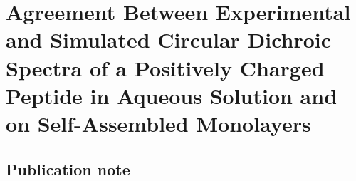 \chapter{Agreement Between Experimental and Simulated Circular Dichroic Spectra of a Positively Charged Peptide in Aqueous Solution and on Self-Assembled Monolayers}\label{helix-folding}

\newcommand{\tbawat}{{2:1 \emph{t}-BuOH/\ce{H2O}}}
\newcommand{\tba}{{\emph{t}-BuOH}}
\newcommand{\pep}{{\textalpha{}11LK(CH)}}


\section{Publication note} \label{helix-pub-note}

